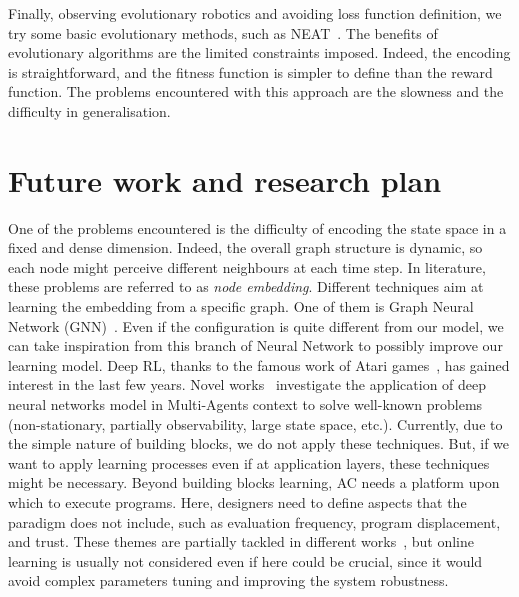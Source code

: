 \documentclass[conference]{IEEEtran}
\begin{document}
Finally, observing evolutionary robotics and avoiding loss function definition, we try some basic evolutionary methods, such as NEAT~\cite{DBLP:journals/ec/StanleyM02}.
%
The benefits of evolutionary algorithms are the limited constraints imposed. Indeed, the encoding is straightforward, and the fitness function is simpler to define than the reward function.
%
The problems encountered with this approach are the slowness and the difficulty in generalisation.
%
\section{Future work and research plan}
One of the problems encountered is the difficulty of encoding the state space in a fixed and dense dimension. Indeed, the overall graph structure is dynamic, so each node might perceive different neighbours at each time step.
%
In literature, these problems are referred to as \emph{node embedding}. Different techniques aim at learning the embedding from a specific graph. One of them is Graph Neural Network (GNN)~\cite{DBLP:journals/tnn/ScarselliGTHM09}.
%
Even if the configuration is quite different from our model, we can take inspiration from this branch of Neural Network to possibly improve our learning model.
%
Deep RL, thanks to the famous work of Atari games~\cite{DBLP:journals/corr/HosuR16}, has gained interest in the last few years. 
%
Novel works~\cite{DBLP:journals/aamas/Hernandez-LealK19} investigate the application of deep neural networks model in Multi-Agents context to solve well-known problems (non-stationary, partially observability, large state space, etc.). 
%
Currently, due to the simple nature of building blocks, we do not apply these techniques. But, if we want to apply learning processes even if at application layers, these techniques might be necessary.
%
%
%
Beyond building blocks learning, AC needs a platform upon which to execute programs. 
%
Here, designers need to define aspects that the paradigm does not include, such as evaluation frequency, program displacement, and trust.
% 
These themes are partially tackled in different works~\cite{DBLP:journals/scp/CasadeiAV18, DBLP:journals/fi/CasadeiPPVW20, DBLP:journals/corr/abs-2012-13806}, but online learning is usually not considered even if here could be crucial, since it would avoid complex parameters tuning and improving the system robustness.
%
\end{document}
